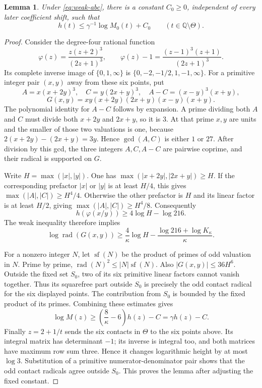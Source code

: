 \documentclass[11pt,a4paper]{article}
\newtheorem{lemma}[theorem]{Lemma}
\newcommand{\Q}{\mathbb Q}\newcommand{\Z}{\mathbb Z}
\begin{document}
\begin{lemma}\label{lem:contact}
Under \eqref{eq:weak-abc}, there is a constant $C_0\ge0$, independent
of every later coefficient shift, such that
\[
                 h(t)\le\gamma^{-1}\log M_0(t)+C_0
                  \qquad(t\in\Q\setminus\Theta).
\]
\end{lemma}
\begin{proof}
Consider the degree-four rational function
\[
 \varphi(z)=\frac{z(z+2)^3}{(2z+1)^3},\qquad
 \varphi(z)-1=\frac{(z-1)^3(z+1)}{(2z+1)^3}.
\]
Its complete inverse image of $\{0,1,\infty\}$ is
$\{0,-2,-1/2,1,-1,\infty\}$. For a primitive integer pair
$(x,y)$ away from these six points, put
\[
 A=x(x+2y)^3,\quad C=y(2x+y)^3,\quad
 A-C=(x-y)^3(x+y),
\]
\[
                G(x,y)=xy(x+2y)(2x+y)(x-y)(x+y).
\]
The polynomial identity for $A-C$ follows by expansion.
A prime dividing both $A$ and $C$ must divide both $x+2y$
and $2x+y$, so it is $3$. At that prime $x,y$ are units
and the smaller of those two valuations is one, because
$2(x+2y)-(2x+y)=3y$. Hence $\gcd(A,C)$ is either $1$ or $27$.
After division by this gcd, the three integers $A,C,A-C$
are pairwise coprime, and their radical is supported on $G$.

Write $H=\max(|x|,|y|)$. One has
$\max(|x+2y|,|2x+y|)\ge H$. If the corresponding prefactor
$|x|$ or $|y|$ is at least $H/4$, this gives
$\max(|A|,|C|)\ge H^4/4$. Otherwise the other prefactor
is $H$ and its linear factor is at least $H/2$, giving
$\max(|A|,|C|)\ge H^4/8$. Consequently
\[
                    h(\varphi(x/y))\ge4\log H-\log216.
\]
The weak inequality therefore implies
\[
 \log\operatorname{rad}(G(x,y))
       \ge\frac4\kappa\log H-\frac{\log216+\log K_\kappa}{\kappa}.
\]

For a nonzero integer $N$, let $\operatorname{sf}(N)$ be the
product of primes of odd valuation in $N$. Prime by prime,
$\operatorname{rad}(N)^2\le |N|\operatorname{sf}(N)$.
Also $|G(x,y)|\le36H^6$. Outside the fixed set $S_0$, two
of its six primitive linear factors cannot vanish together.
Thus its squarefree part outside $S_0$ is precisely the odd
contact radical for the six displayed points. The contribution
from $S_0$ is bounded by the fixed product of its primes.
Combining these estimates gives
\[
 \log M(z)\ge\left(\frac8\kappa-6\right)h(z)-C
             =\gamma h(z)-C.
\]
Finally $z=2+1/t$ sends the six contacts in $\Theta$ to the
six points above. Its integral matrix has determinant $-1$;
its inverse is integral too, and both matrices have maximum
row sum three. Hence it changes logarithmic height by at most
$\log3$. Substitution of a primitive numerator-denominator pair
shows that the odd contact radicals agree outside $S_0$.
This proves the lemma after adjusting the fixed constant.
\end{proof}
\end{document}
